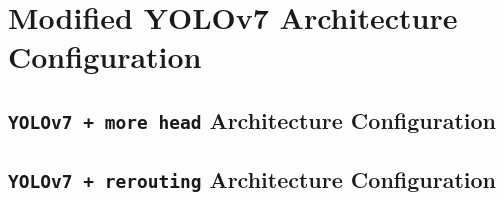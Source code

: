 \chapter{Modified YOLOv7 Architecture Configuration}
\section{\texttt{YOLOv7 + more head} Architecture Configuration}

\section{\texttt{YOLOv7 + rerouting} Architecture Configuration}

